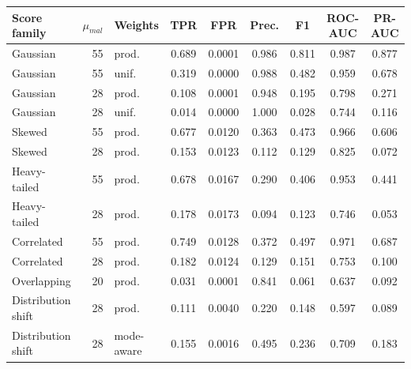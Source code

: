 \begin{tabular}{@{}lrlcccccc@{}}
\toprule
Score family & $\mu_{mal}$ & Weights & TPR & FPR & Prec. & F1 & ROC-AUC & PR-AUC \\
\midrule
Gaussian & 55 & prod. & 0.689 & 0.0001 & 0.986 & 0.811 & 0.987 & 0.877 \\
Gaussian & 55 & unif. & 0.319 & 0.0000 & 0.988 & 0.482 & 0.959 & 0.678 \\
Gaussian & 28 & prod. & 0.108 & 0.0001 & 0.948 & 0.195 & 0.798 & 0.271 \\
Gaussian & 28 & unif. & 0.014 & 0.0000 & 1.000 & 0.028 & 0.744 & 0.116 \\
Skewed & 55 & prod. & 0.677 & 0.0120 & 0.363 & 0.473 & 0.966 & 0.606 \\
Skewed & 28 & prod. & 0.153 & 0.0123 & 0.112 & 0.129 & 0.825 & 0.072 \\
Heavy-tailed & 55 & prod. & 0.678 & 0.0167 & 0.290 & 0.406 & 0.953 & 0.441 \\
Heavy-tailed & 28 & prod. & 0.178 & 0.0173 & 0.094 & 0.123 & 0.746 & 0.053 \\
Correlated & 55 & prod. & 0.749 & 0.0128 & 0.372 & 0.497 & 0.971 & 0.687 \\
Correlated & 28 & prod. & 0.182 & 0.0124 & 0.129 & 0.151 & 0.753 & 0.100 \\
Overlapping & 20 & prod. & 0.031 & 0.0001 & 0.841 & 0.061 & 0.637 & 0.092 \\
Distribution shift & 28 & prod. & 0.111 & 0.0040 & 0.220 & 0.148 & 0.597 & 0.089 \\
Distribution shift & 28 & mode-aware & 0.155 & 0.0016 & 0.495 & 0.236 & 0.709 & 0.183 \\
\bottomrule
\end{tabular}
